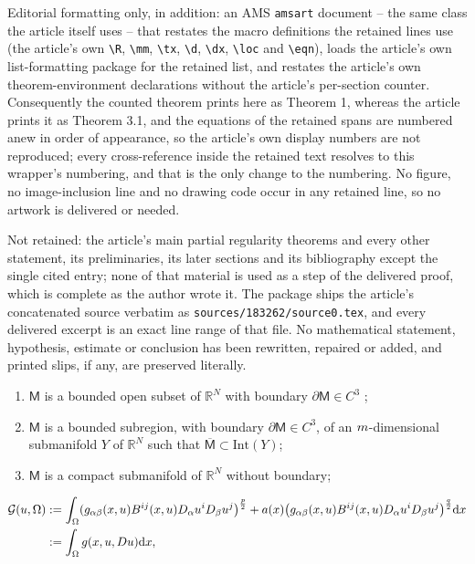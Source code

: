 \documentclass[10pt,a4paper]{amsart}
\theoremstyle{plain}
\theoremstyle{definition}
\theoremstyle{remark}
\newcommand{\R}{\mathbb{R}}
\newcommand{\mm}{\mathsf{M}}
\newcommand{\tx}[1]{\textnormal{\texttt{#1}}}
\begin{document}
Editorial formatting only, in addition: an AMS \texttt{amsart} document -- the same class the article itself uses -- that restates the macro definitions the retained lines use (the article's own \texttt{\textbackslash R}, \texttt{\textbackslash mm}, \texttt{\textbackslash tx}, \texttt{\textbackslash d}, \texttt{\textbackslash dx}, \texttt{\textbackslash loc} and \texttt{\textbackslash eqn}), loads the article's own list-formatting package for the retained list, and restates the article's own theorem-environment declarations without the article's per-section counter. Consequently the counted theorem prints here as Theorem 1, whereas the article prints it as Theorem 3.1, and the equations of the retained spans are numbered anew in order of appearance, so the article's own display numbers are not reproduced; every cross-reference inside the retained text resolves to this wrapper's numbering, and that is the only change to the numbering. No figure, no image-inclusion line and no drawing code occur in any retained line, so no artwork is delivered or needed.

Not retained: the article's main partial regularity theorems and every other statement, its preliminaries, its later sections and its bibliography except the single cited entry; none of that material is used as a step of the delivered proof, which is complete as the author wrote it. The package ships the article's concatenated source verbatim as \texttt{sources/183262/source0.tex}, and every delivered excerpt is an exact line range of that file. No mathematical statement, hypothesis, estimate or conclusion has been rewritten, repaired or added, and printed slips, if any, are preserved literally.
\begin{enumerate}[label=\tx{\alph*.}, ref=\tx{\alph*}]
    \item\label{item:a} $\mm$ is a bounded open subset of $\R^N$ with boundary $ \partial \mm \in C^3$ ;
    \item\label{item:b}$\mm$ is a bounded subregion, with boundary $\partial \mm \in C^3$, of an $\tx{m}$-dimensional submanifold $Y$ of $\R^N$ such that $\overline{\mm} \subset \text{Int}(Y)$;
    \item\label{item:c} $\mm$ is a compact submanifold of $\R^N$ without boundary;
\end{enumerate}

\begin{align}\label{functionalG}
\mathcal{G}(u,\Omega)  &:=  \int_{\Omega} (g_{\alpha \beta}(x,u) B^{ij}(x, u) D_{\alpha}u^i D_{\beta}u^j\bigr)^{\frac{p}{2}} 
+
 a(x)\bigl(g_{\alpha \beta}(x,u) B^{ij}(x, u) D_{\alpha}u^i D_{\beta}u^j\bigr)^{\frac{q}{2}} \mathrm{d}x \notag \\ & :=  \int_{\Omega} \tx{g}(x,u,Du) \mathrm{d}x,
\end{align}
\end{document}
